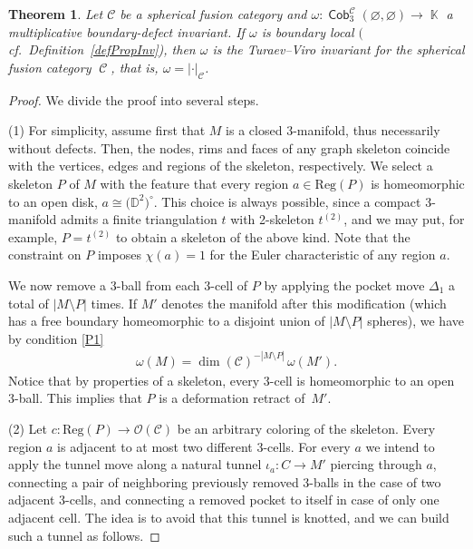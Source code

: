 \documentclass[10pt,a4paper]{amsart}
\DeclareMathOperator{\K}{\mathbb{K}}
\DeclareMathOperator{\Cob}{\mathsf{Cob}}
\DeclareMathOperator{\calc}{\mathcal{C}}
\numberwithin{equation}{section}
\newtheorem{Theorem}{Theorem}[section]
\theoremstyle{definition}
\begin{document}
\begin{Theorem}
 \label{thmMain}
 Let $\mathcal{C}$ be a spherical fusion category and $\omega\colon \Cob_3^{\mathcal{C}}(\varnothing, \varnothing) \rightarrow \K$ a multiplicative boundary-defect invariant. If $\omega$ is boundary local $($cf.\ Definition~{\rm \ref{defPropInv})}, then $\omega$ is the Turaev--Viro invariant for the spherical fusion category $\calc$, that is, $\omega = | \cdot |_{\calc}$.
\end{Theorem}
\begin{proof}
 We divide the proof into several steps.

 (1) For simplicity, assume first that $M$ is a closed 3-manifold, thus necessarily without defects. Then, the nodes, rims and faces of any graph skeleton coincide with the vertices, edges and regions of the skeleton, respectively. We select a skeleton $P$ of $M$ with the feature that every region $a \in \mathrm{Reg}(P)$ is homeomorphic to an open disk, $a \cong \bigl(\mathbb{D}^2\bigr)^{\circ}$. This choice is always possible, since a compact 3-manifold admits a finite triangulation $t$ with 2-skeleton $t^{(2)}$, and we may put, for example, $P = t^{(2)}$ to obtain a skeleton of the above kind. Note that the constraint on $P$ imposes $\chi(a) = 1$ for the Euler characteristic of any region $a$.

 We now remove a 3-ball from each 3-cell of $P$ by applying the pocket move $\Delta_1$ a total of $|M\setminus P|$ times. If $M'$ denotes the manifold after this modification (which has a free boundary homeomorphic to a disjoint union of $|M\setminus P|$ spheres), we have by condition \ref{P1}
 \begin{align}
 \label{eqT1}
 \omega(M) = \dim(\mathcal{C})^{-|M\setminus P|} \, \omega(M').
 \end{align}
 Notice that by properties of a skeleton, every 3-cell is homeomorphic to an open 3-ball. This implies that $P$ is a deformation retract of~$M'$.

 (2) Let $c\colon \mathrm{Reg}(P) \rightarrow \mathcal{O}({\mathcal{C}})$ be an arbitrary coloring of the skeleton. Every region $a$ is adjacent to at most two different 3-cells. For every $a$ we intend to apply the tunnel move  along a natural tunnel $\iota_a\colon C \rightarrow M'$ piercing through $a$, connecting a pair of neighboring previously removed 3-balls in the case of two adjacent 3-cells, and connecting a removed pocket to itself in case of only one adjacent cell. The idea is to avoid that this tunnel is knotted, and we can build such a tunnel as follows.


\end{proof}
\end{document}
